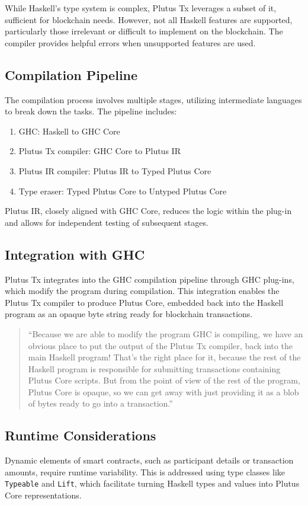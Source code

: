 While Haskell's type system is complex, Plutus Tx leverages a subset of it, sufficient for blockchain needs. However, not all Haskell features are supported, particularly those irrelevant or difficult to implement on the blockchain. The compiler provides helpful errors when unsupported features are used.

\subsection{Compilation Pipeline}
The compilation process involves multiple stages, utilizing intermediate languages to break down the tasks. The pipeline includes:

\begin{enumerate}
    \item GHC: Haskell to GHC Core
    \item Plutus Tx compiler: GHC Core to Plutus IR
    \item Plutus IR compiler: Plutus IR to Typed Plutus Core
    \item Type eraser: Typed Plutus Core to Untyped Plutus Core
\end{enumerate}

Plutus IR, closely aligned with GHC Core, reduces the logic within the plug-in and allows for independent testing of subsequent stages.

\subsection{Integration with GHC}
Plutus Tx integrates into the GHC compilation pipeline through GHC plug-ins, which modify the program during compilation. This integration enables the Plutus Tx compiler to produce Plutus Core, embedded back into the Haskell program as an opaque byte string ready for blockchain transactions.

\begin{quote}
``Because we are able to modify the program GHC is compiling, we have an obvious place to put the output of the Plutus Tx compiler, back into the main Haskell program! That’s the right place for it, because the rest of the Haskell program is responsible for submitting transactions containing Plutus Core scripts. But from the point of view of the rest of the program, Plutus Core is opaque, so we can get away with just providing it as a blob of bytes ready to go into a transaction.''
\end{quote}

\subsection{Runtime Considerations}
Dynamic elements of smart contracts, such as participant details or transaction amounts, require runtime variability. This is addressed using type classes like \texttt{Typeable} and \texttt{Lift}, which facilitate turning Haskell types and values into Plutus Core representations.

